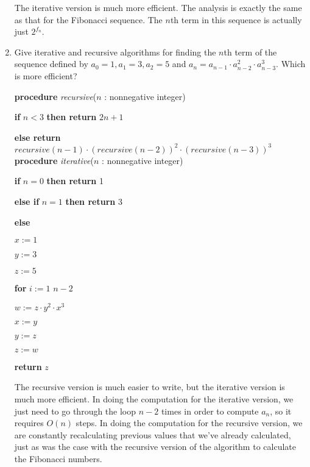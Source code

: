 \documentclass[11pt]{article}
\begin{document}
\begin{enumerate}[label=\textbf{\arabic*.}]
	The iterative version is much more efficient. The analysis is exactly the same as that for the Fibonacci sequence. The $n$th term in this sequence is actually just $2^{f_n}$.
	
	\item Give iterative and recursive algorithms for finding the $n$th term of the sequence defined by $a_0 = 1, a_1 = 3, a_2 = 5$ and $a_n = a_{n - 1} \cdot a^2_{n - 2} \cdot a^3_{n - 3}$. Which is more efficient?
	
	\textbf{procedure} \emph{recursive}($n$ : nonnegative integer)
	
	\textbf{if} $n < 3$ \textbf{then return} $2n + 1$
	
	\textbf{else return} $recursive(n - 1) \cdot (recursive(n - 2))^2 \cdot (recursive(n - 3))^3$ \\
	
	\textbf{procedure} \emph{iterative}($n$ : nonnegative integer)
	
	\textbf{if} $n = 0$ \textbf{then return} 1
	
	\textbf{else if} $n = 1$ \textbf{then return} 3
	
	\textbf{else}
	
	\qquad $x := 1$
	
	\qquad $y := 3$
	
	\qquad $z := 5$
	
	\qquad \textbf{for} $i := 1$  $n - 2$
	
	\qquad\qquad $w := z \cdot y^2 \cdot x^3$
	
	\qquad\qquad $x := y$
	
	\qquad\qquad $y := z$
	
	\qquad\qquad $z := w$
	
	\textbf{return} $z$
	
	The recursive version is much easier to write, but the iterative version is much more efficient. In doing the computation for the iterative version, we just need to go through the loop $n - 2$ times in order to compute $a_n$, so it requires $O(n)$ steps. In doing the computation for the recursive version, we are constantly recalculating previous values that we've already calculated, just as was the case with the recursive version of the algorithm to calculate the Fibonacci numbers.
\end{enumerate}
\end{document}
